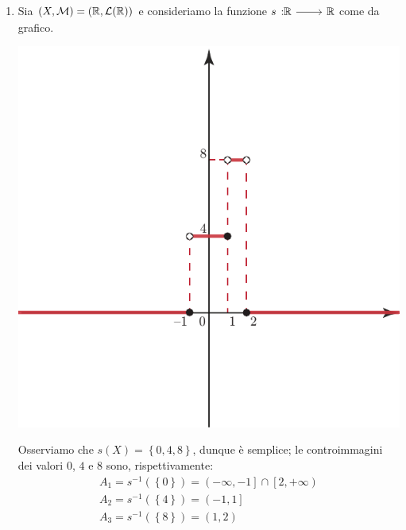 \begin{examples}~{} \label{funzionesemplice}
	\begin{enumerate}
		\item Sia $\left(X,\mathcal{M}\right)=\left(\mathbb{R},\mathcal{L}(\mathbb{R})\right)$ e consideriamo la funzione $\funz{s}{\realset}{\realset}$ come da grafico.\\
		\begin{minipage}{0.4\textwidth}
			\includegraphics[trim=3cm 2cm 0cm 0cm, clip, scale=0.7]{images/graficosemplice.pdf}
		\end{minipage}\hspace{-7mm}
		\begin{minipage}{0.55\textwidth}
			Osserviamo che $s(X)=\left\{0,4,8\right\}$, dunque è semplice; le controimmagini dei valori $0$, $4$ e $8$ sono, rispettivamente:
			\begin{equation*}
				\begin{array}{l}
					A_1=s^{-1}\left(\left\{0\right\}\right)=\left(-\infty,-1\right]\cap\left[2,+\infty\right)\\
					A_2=s^{-1}\left(\left\{4\right\}\right)=\left(-1,1\right]\\
					A_3=s^{-1}\left(\left\{8\right\}\right)=\left(1,2\right)
				\end{array}
			\end{equation*}

\end{minipage}
\end{enumerate}
\end{examples}
